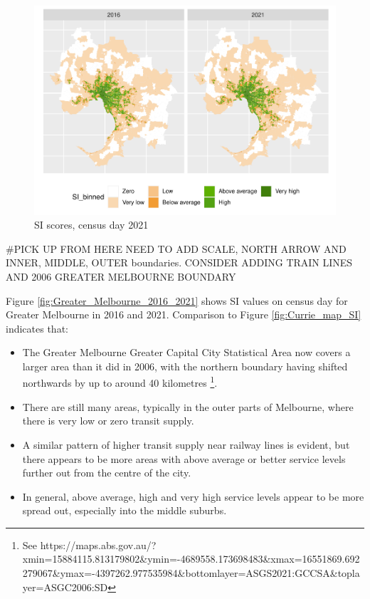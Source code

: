 \documentclass[preprint, 3p,
authoryear]{elsarticle} %
\providecommand{\tightlist}{%
  \setlength{\itemsep}{0pt}\setlength{\parskip}{0pt}}
\begin{document}
\begin{figure}
\centering
\includegraphics{Leveraging_GTFS_to_assess_transit_supply_Transport_Geography_files/figure-latex/Greater_Melbourne_2016_2021_comparison-1.pdf}
\caption{SI scores, census day 2021}
\end{figure}

\#PICK UP FROM HERE NEED TO ADD SCALE, NORTH ARROW AND INNER, MIDDLE,
OUTER boundaries. CONSIDER ADDING TRAIN LINES AND 2006 GREATER MELBOURNE
BOUNDARY

Figure \ref{fig:Greater_Melbourne_2016_2021} shows SI values on census
day for Greater Melbourne in 2016 and 2021. Comparison to Figure
\ref{fig:Currie_map_SI} indicates that:

\begin{itemize}
\tightlist
\item
  The Greater Melbourne Greater Capital City Statistical Area now covers
  a larger area than it did in 2006, with the northern boundary having
  shifted northwards by up to around 40 kilometres \footnote{See
    https://maps.abs.gov.au/?xmin=15884115.813179802\&ymin=-4689558.173698483\&xmax=16551869.692279067\&ymax=-4397262.977535984\&bottomlayer=ASGS2021:GCCSA\&toplayer=ASGC2006:SD}.
\item
  There are still many areas, typically in the outer parts of Melbourne,
  where there is very low or zero transit supply.
\item
  A similar pattern of higher transit supply near railway lines is
  evident, but there appears to be more areas with above average or
  better service levels further out from the centre of the city.
\item
  In general, above average, high and very high service levels appear to
  be more spread out, especially into the middle suburbs.
\end{itemize}
\end{document}
